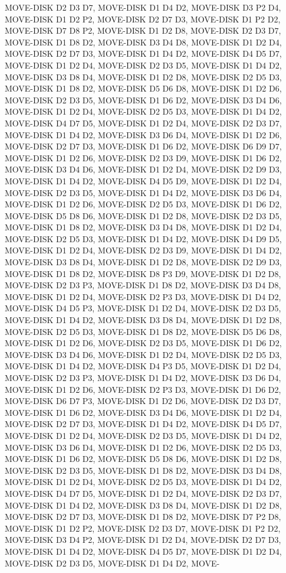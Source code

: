\documentclass[12pt]{article}
\begin{document}
\begin{appendix}
\begin{itemize}
MOVE-DISK D2 D3 D7,  MOVE-DISK D1 D4 D2,  MOVE-DISK D3 P2 D4,  MOVE-DISK D1 D2 P2,  MOVE-DISK D2 D7 D3,  MOVE-DISK D1 P2 D2,  MOVE-DISK D7 D8 P2,  MOVE-DISK D1 D2 D8,  MOVE-DISK D2 D3 D7,  MOVE-DISK D1 D8 D2,  MOVE-DISK D3 D4 D8,  MOVE-DISK D1 D2 D4,  MOVE-DISK D2 D7 D3,  MOVE-DISK D1 D4 D2,  MOVE-DISK D4 D5 D7,  MOVE-DISK D1 D2 D4,  MOVE-DISK D2 D3 D5,  MOVE-DISK D1 D4 D2,  MOVE-DISK D3 D8 D4,  MOVE-DISK D1 D2 D8,  MOVE-DISK D2 D5 D3,  MOVE-DISK D1 D8 D2,  MOVE-DISK D5 D6 D8,  MOVE-DISK D1 D2 D6,  MOVE-DISK D2 D3 D5,  MOVE-DISK D1 D6 D2,  MOVE-DISK D3 D4 D6,  MOVE-DISK D1 D2 D4,  MOVE-DISK D2 D5 D3,  MOVE-DISK D1 D4 D2,  MOVE-DISK D4 D7 D5,  MOVE-DISK D1 D2 D4,  MOVE-DISK D2 D3 D7,  MOVE-DISK D1 D4 D2,  MOVE-DISK D3 D6 D4,  MOVE-DISK D1 D2 D6,  MOVE-DISK D2 D7 D3,  MOVE-DISK D1 D6 D2,  MOVE-DISK D6 D9 D7,  MOVE-DISK D1 D2 D6,  MOVE-DISK D2 D3 D9,  MOVE-DISK D1 D6 D2,  MOVE-DISK D3 D4 D6,  MOVE-DISK D1 D2 D4,  MOVE-DISK D2 D9 D3,  MOVE-DISK D1 D4 D2,  MOVE-DISK D4 D5 D9,  MOVE-DISK D1 D2 D4,  MOVE-DISK D2 D3 
D5,  MOVE-DISK D1 D4 D2,  MOVE-DISK D3 D6 D4,  MOVE-DISK D1 D2 D6,  MOVE-DISK D2 D5 D3,  MOVE-DISK D1 D6 D2,  MOVE-DISK D5 D8 D6,  MOVE-DISK D1 D2 D8,  MOVE-DISK D2 D3 D5,  MOVE-DISK D1 D8 D2,  MOVE-DISK D3 D4 D8,  MOVE-DISK D1 D2 D4,  MOVE-DISK D2 D5 D3,  MOVE-DISK D1 D4 D2,  MOVE-DISK D4 D9 D5,  MOVE-DISK D1 D2 D4,  MOVE-DISK D2 D3 D9,  MOVE-DISK D1 D4 D2,  MOVE-DISK D3 D8 D4,  MOVE-DISK D1 D2 D8,  MOVE-DISK D2 D9 D3,  MOVE-DISK D1 D8 D2,  MOVE-DISK D8 P3 D9,  MOVE-DISK D1 D2 D8,  MOVE-DISK D2 D3 P3,  MOVE-DISK D1 D8 D2,  MOVE-DISK D3 D4 D8,  MOVE-DISK D1 D2 D4,  MOVE-DISK D2 P3 D3,  MOVE-DISK D1 D4 D2,  MOVE-DISK D4 D5 P3,  MOVE-DISK D1 D2 D4,  MOVE-DISK D2 D3 D5,  MOVE-DISK D1 D4 D2,  MOVE-DISK D3 D8 D4,  MOVE-DISK D1 D2 D8,  MOVE-DISK D2 D5 D3,  MOVE-DISK D1 D8 D2,  MOVE-DISK D5 D6 D8,  MOVE-DISK D1 D2 D6,  MOVE-DISK D2 D3 D5,  MOVE-DISK D1 D6 D2,  MOVE-DISK D3 D4 D6,  MOVE-DISK D1 D2 D4,  MOVE-DISK D2 D5 D3,  MOVE-DISK D1 D4 D2,  MOVE-DISK D4 P3 D5,  MOVE-DISK D1 D2 D4,  MOVE-DISK D2 D3 P3,  MOVE-DISK 
D1 D4 D2,  MOVE-DISK D3 D6 D4,  MOVE-DISK D1 D2 D6,  MOVE-DISK D2 P3 D3,  MOVE-DISK D1 D6 D2,  MOVE-DISK D6 D7 P3,  MOVE-DISK D1 D2 D6,  MOVE-DISK D2 D3 D7,  MOVE-DISK D1 D6 D2,  MOVE-DISK D3 D4 D6,  MOVE-DISK D1 D2 D4,  MOVE-DISK D2 D7 D3,  MOVE-DISK D1 D4 D2,  MOVE-DISK D4 D5 D7,  MOVE-DISK D1 D2 D4,  MOVE-DISK D2 D3 D5,  MOVE-DISK D1 D4 D2,  MOVE-DISK D3 D6 D4,  MOVE-DISK D1 D2 D6,  MOVE-DISK D2 D5 D3,  MOVE-DISK D1 D6 D2,  MOVE-DISK D5 D8 D6,  MOVE-DISK D1 D2 D8,  MOVE-DISK D2 D3 D5,  MOVE-DISK D1 D8 D2,  MOVE-DISK D3 D4 D8,  MOVE-DISK D1 D2 D4,  MOVE-DISK D2 D5 D3,  MOVE-DISK D1 D4 D2,  MOVE-DISK D4 D7 D5,  MOVE-DISK D1 D2 D4,  MOVE-DISK D2 D3 D7,  MOVE-DISK D1 D4 D2,  MOVE-DISK D3 D8 D4,  MOVE-DISK D1 D2 D8,  MOVE-DISK D2 D7 D3,  MOVE-DISK D1 D8 D2,  MOVE-DISK D7 P2 D8,  MOVE-DISK D1 D2 P2,  MOVE-DISK D2 D3 D7,  MOVE-DISK D1 P2 D2,  MOVE-DISK D3 D4 P2,  MOVE-DISK D1 D2 D4,  MOVE-DISK D2 D7 D3,  MOVE-DISK D1 D4 D2,  MOVE-DISK D4 D5 D7,  MOVE-DISK D1 D2 D4,  MOVE-DISK D2 D3 D5,  MOVE-DISK D1 D4 D2,  MOVE-

\end{itemize}
\end{appendix}
\end{document}
